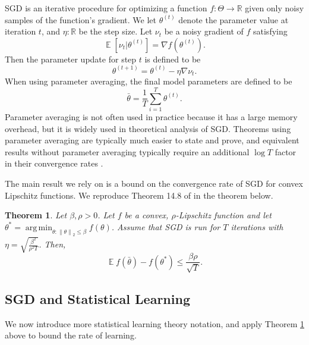 \documentclass[twoside]{article}
\newtheorem{theorem}{Theorem}
\DeclareMathOperator{\E}{\mathbb E}
\DeclareMathOperator*{\argmin}{arg\,min}
\renewcommand{\star}[1]{{#1}^{*}}
\newcommand{\ltwo}[1]{{\lVert {#1} \rVert}_2}
\begin{document}
SGD is an iterative procedure for optimizing a function $f : \Theta \to \mathbb R$ given only noisy samples of the function's gradient.
We let $\theta^{(t)}$ denote the parameter value at iteration $t$,
and $\eta : \mathbb R$ be the step size.
Let $\nu_t$ be a noisy gradient of $f$ satisfying
\begin{equation}
    \E[\nu_t | \theta^{(t)}] = \nabla f(\theta^{(t)}).
\end{equation}
Then the parameter update for step $t$ is defined to be
\begin{equation}
    \theta^{(t+1)} = \theta^{(t)} - \eta \nabla \nu_t
    .
\end{equation}
When using parameter averaging, the final model parameters are defined to be
\begin{equation}
    \bar\theta = \frac1T \sum_{i=1}^T \theta^{(t)}
    .
\end{equation}
Parameter averaging is not often used in practice because it has a large memory overhead,
but it is widely used in theoretical analysis of SGD.
Theorems using parameter averaging are typically much easier to state and prove,
and equivalent results without parameter averaging typically require an additional $\log T$ factor in their convergence rates \citep{rakhlin2011making}.

The main result we rely on is a bound on the convergence rate of SGD for convex Lipschitz functions.
We reproduce Theorem 14.8 of \citet{shalev2014understanding} in the theorem below.

\begin{theorem}
    \label{thm:sgd}
    Let $\beta,\rho>0$.
    Let $f$ be a convex, $\rho$-Lipschitz function and let $\star \theta = \argmin_{\theta : \ltwo{\theta}\le \beta} f(\theta)$.
    Assume that SGD is run for $T$ iterations with $\eta = \sqrt{\frac{\beta^2}{\rho^2 T}}$.
    Then,
    \begin{equation}
        \E f(\bar \theta) - f(\star \theta) \le \frac{\beta\rho}{\sqrt{T}}
        .
    \end{equation}
\end{theorem}

\subsection{SGD and Statistical Learning}

We now introduce more statistical learning theory notation,
and apply Theorem \ref{thm:sgd} above to bound the rate of learning.
\end{document}
